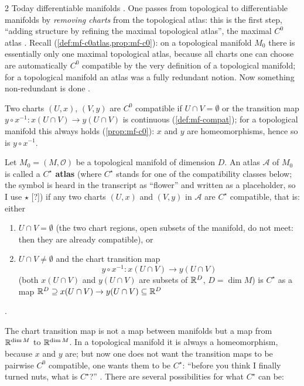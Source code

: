 \begin{paracol}{2}
Today differentiable manifolds . One passes from topological to differentiable manifolds by \emph{removing charts} from the topological atlas: this is the first step, ``adding structure by refining the maximal topological atlas'', the maximal $C^0$ atlas
.
Recall (\cref{def:mf-c0atlas,prop:mf-c0}): on a topological manifold $M_0$ there is essentially only one maximal topological atlas, because all charts one can choose are automatically $C^0$ compatible by the very definition of a topological manifold; for a topological manifold an atlas was a fully
redundant notion. Now something non-redundant is done .
\begin{recall}[$C^0$ compatibility]
Two charts $(U,x)$, $(V,y)$ are $C^0$ compatible if $U\cap V=\emptyset$ or the transition map $y\circ x^{-1}\colon x(U\cap V)\to y(U\cap V)$ is continuous (\cref{def:mf-compat}); for a topological manifold this always holds (\cref{prop:mf-c0}):
$x$ and $y$ are homeomorphisms, hence so is $y\circ x^{-1}$.
\end{recall}

\begin{definition}\label{def:df-star}
Let $M_0=(M,\mathcal O)$ be a topological manifold of dimension $D$. An atlas $\mathcal A$ of $M_0$ is called a \textbf{$C^\star$ atlas} (where $C^\star$ stands for one of the compatibility classes below; the symbol is heard in the transcript as ``flower'' and written
as a placeholder, so I use $\star$ [?]) if any two charts $(U,x)$ and $(V,y)$ in $\mathcal A$ are $C^\star$ compatible, that is: either
\begin{enumerate}
  \item $U\cap V=\emptyset$ (the two chart regions, open subsets of the manifold, do not meet: then they are already compatible), or
  \item $U\cap V\ne\emptyset$ and the chart transition map
        \[
          y\circ x^{-1}\colon x(U\cap V)\to y(U\cap V)
        \]
        (both $x(U\cap V)$ and $y(U\cap V)$ are subsets of $\mathbb{R}^D$, $D=\dim M$) is $C^\star$ as a map $\mathbb{R}^D\supseteq x(U\cap V)\to y(U\cap V)\subseteq\mathbb{R}^D$
\end{enumerate}
.
\end{definition}
The chart transition map is not a map between manifolds but a map from $\mathbb{R}^{\dim M}$ to $\mathbb{R}^{\dim M}$. In a topological manifold it is always a homeomorphism, because $x$ and $y$ are; but now one does not want the transition maps to be pairwise $C^0$ compatible, one wants them
to be $C^\star$: ``before you think I finally turned nuts, what is $C^\star$?'' . There are several possibilities for what $C^\star$ can be:


\end{paracol}
